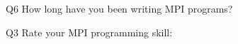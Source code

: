 \begin{description}%
\item{Q6} How long have you been writing MPI programs?%
\item{Q3} Rate your MPI programming skill:%
\end{description}%
